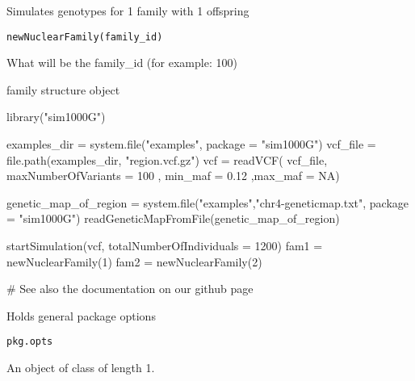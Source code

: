 \documentclass[letterpaper]{book}
\begin{document}
%
\begin{Description}\relax
Simulates genotypes for 1 family with 1 offspring
\end{Description}
%
\begin{Usage}
\begin{verbatim}
newNuclearFamily(family_id)
\end{verbatim}
\end{Usage}
%
\begin{Arguments}
\begin{ldescription}
\item[\code{family\_id}] What will be the family\_id (for example: 100)
\end{ldescription}
\end{Arguments}
%
\begin{Value}
family structure object
\end{Value}
%
\begin{Examples}
\begin{ExampleCode}

library("sim1000G")

examples_dir = system.file("examples", package = "sim1000G")
vcf_file = file.path(examples_dir, "region.vcf.gz")
vcf = readVCF( vcf_file, maxNumberOfVariants = 100 ,
   min_maf = 0.12 ,max_maf = NA)

genetic_map_of_region = system.file("examples","chr4-geneticmap.txt",
   package = "sim1000G")
readGeneticMapFromFile(genetic_map_of_region)

startSimulation(vcf, totalNumberOfIndividuals = 1200)
fam1 = newNuclearFamily(1)
fam2 = newNuclearFamily(2)

# See also the documentation on our github page

\end{ExampleCode}
\end{Examples}
%
\begin{Description}\relax
Holds general package options
\end{Description}
%
\begin{Usage}
\begin{verbatim}
pkg.opts
\end{verbatim}
\end{Usage}
%
\begin{Format}
An object of class  of length 1.
\end{Format}
\end{document}
